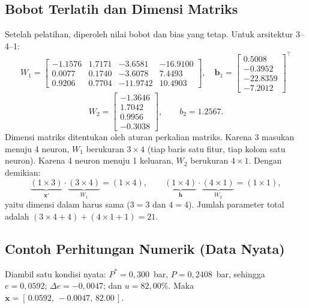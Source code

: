 \subsection{Bobot Terlatih dan Dimensi Matriks}
\label{sub:bobot}
Setelah pelatihan, diperoleh nilai bobot dan bias yang tetap. Untuk arsitektur
3--4--1:
\begin{equation}
W_1 =
\begin{bmatrix}
-1.1576 & 1.7171 & -3.6581 & -16.9100\\
0.0077 & 0.1740 & -3.6078 & 7.4493\\
0.9206 & 0.7704 & -11.9742 & 10.4903
\end{bmatrix},\quad
\mathbf{b}_1 =
\begin{bmatrix}
0.5008\\ -0.3952\\ -22.8359\\ -7.2012
\end{bmatrix}^{\!\top}
\label{eq:W1}
\end{equation}
\begin{equation}
W_2 =
\begin{bmatrix}
-1.3646\\ 1.7042\\ 0.9956\\ -0.3038
\end{bmatrix},\qquad
b_2 = 1.2567 .
\label{eq:W2}
\end{equation}
Dimensi matriks ditentukan oleh aturan perkalian matriks. Karena 3 masukan menuju 4
neuron, $W_1$ berukuran $3\times4$ (tiap baris satu fitur, tiap kolom satu neuron).
Karena 4 neuron menuju 1 keluaran, $W_2$ berukuran $4\times1$. Dengan demikian:
\begin{equation}
\underbrace{(1\times3)}_{\mathbf{x'}}\cdot\underbrace{(3\times4)}_{W_1}=(1\times4),
\qquad
\underbrace{(1\times4)}_{\mathbf{h}}\cdot\underbrace{(4\times1)}_{W_2}=(1\times1),
\end{equation}
yaitu dimensi dalam harus sama ($3=3$ dan $4=4$). Jumlah parameter total adalah
$(3\times4+4)+(4\times1+1)=21$.

\subsection{Contoh Perhitungan Numerik (Data Nyata)}
\label{sub:contoh}
Diambil satu kondisi nyata: $P^{*}=0{,}300$~bar, $P=0{,}2408$~bar, sehingga
$e=0{,}0592$; $\Delta e=-0{,}0047$; dan $u=82{,}00\%$. Maka
$\mathbf{x}=[\,0.0592,\,-0.0047,\,82.00\,]$.

